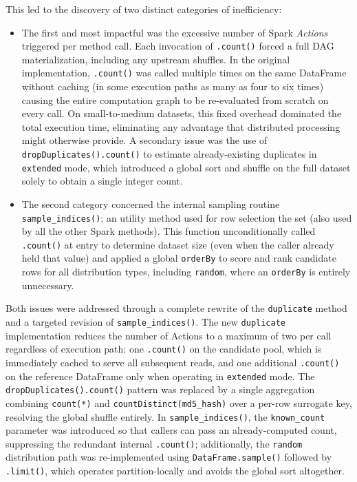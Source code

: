 \documentclass[../main.tex]{subfiles}
\begin{document}
This led to the discovery of two distinct categories of inefficiency:
\begin{itemize}
    \item The first and most impactful was the excessive number of Spark \emph{Actions} triggered per method call. Each invocation of \texttt{.count()} forced a full DAG materialization, including any upstream shuffles. In the original implementation, \texttt{.count()} was called multiple times on the same DataFrame without caching (in some execution paths as many as four to six times) causing the entire computation graph to be re-evaluated from scratch on every call. On small-to-medium datasets, this fixed overhead dominated the total execution time, eliminating any advantage that distributed processing might otherwise provide. A secondary issue was the use of \texttt{dropDuplicates().count()} to estimate already-existing duplicates in \texttt{extended} mode, which introduced a global sort and shuffle on the full dataset solely to obtain a single integer count.
    \item The second category concerned the internal sampling routine \texttt{sample\_indices()}: an utility method used for row selection the set (also used by all the other Spark methods). This function unconditionally called \texttt{.count()} at entry to determine dataset size (even when the caller already held that value) and applied a global \texttt{orderBy} to score and rank candidate rows for all distribution types, including \texttt{random}, where an \texttt{orderBy} is entirely unnecessary.
\end{itemize}

Both issues were addressed through a complete rewrite of the \texttt{duplicate} method and a targeted revision of \texttt{sample\_indices()}. The new \texttt{duplicate} implementation reduces the number of Actions to a maximum of two per call regardless of execution path: one \texttt{.count()} on the candidate pool, which is immediately cached to serve all subsequent reads, and one additional \texttt{.count()} on the reference DataFrame only when operating in \texttt{extended} mode. The \texttt{dropDuplicates().count()}
pattern was replaced by a single aggregation combining \texttt{count(*)} and \texttt{countDistinct(md5\_hash)} over a per-row surrogate key, resolving the global shuffle entirely. In \texttt{sample\_indices()}, the \texttt{known\_count} parameter was introduced so that callers can pass an already-computed count, suppressing the redundant internal \texttt{.count()}; additionally, the \texttt{random} distribution path was re-implemented using \texttt{DataFrame.sample()} followed by \texttt{.limit()}, which operates partition-locally and avoids the global sort altogether.
\end{document}
